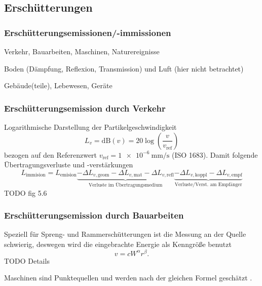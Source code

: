 \subsection{Erschütterungen}

\begin{frame}
\frametitle{Erschütterungsemissionen/-immissionen}
\begin{center}
 
\end{center}
\begin{description}[leftmargin=!,labelwidth=1mm]
\item[Quellen] Verkehr, Bauarbeiten, Maschinen, Naturereignisse
\item[Übertragungsweg] Boden (Dämpfung, Reflexion, Transmission) und Luft (hier nicht betrachtet) 
\item[Empfänger] Gebäude(teile), Lebewesen, Geräte
\end{description}
\end{frame}


\begin{frame}
\frametitle{Erschütterungsemission {\normalsize durch Verkehr}}
Logarithmische Darstellung der Partikelgeschwindigkeit \cite{studer2008bodendynamik}
\begin{equation*}
 L_v=\mathrm{dB}(v)=20\log\left(\frac{v}{v_\mathrm{ref}}\right)
\end{equation*}
bezogen auf den Referenzwert $v_\mathrm{ref}=\SI{1e-6}{\milli\metre\per\second}$ (ISO 1683).
Damit folgende Übertragungsverluste und -verstärkungen
\begin{equation*}
L_\mathrm{immision}=L_\mathrm{emision}
\underbrace{-\Delta L_{v,\mathrm{geom}}-\Delta L_{v,\mathrm{mat}}- \Delta L_{v,\mathrm{refl}}}_{\text{Verluste im Übertragungsmedium}}
\underbrace{-\Delta L_{v,\mathrm{koppl}}-\Delta L_{v,\mathrm{empf}}}_{\text{Verluste/Verst. am Empfänger}}
\end{equation*}
TODO fig 5.6 \cite{studer2008bodendynamik}
\end{frame}


\begin{frame}
\frametitle{Erschütterungsemission {\normalsize durch Bauarbeiten}}
Speziell für Spreng- und Rammerschütterungen \cite{studer2008bodendynamik} ist die Messung an der Quelle schwierig, deswegen wird die eingebrachte Energie als Kenngröße benutzt
\begin{equation*}
 v=cW^\alpha r^\beta.
\end{equation*}
TODO Details

Maschinen sind Punktequellen und werden nach der gleichen Formel geschätzt \cite{studer2008bodendynamik}.
\end{frame}


